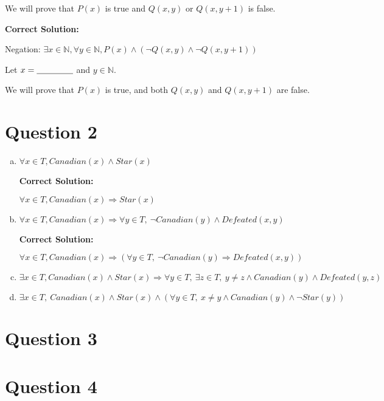 \documentclass[12pt]{article}
\begin{document}
\begin{enumerate}[a.]
    We will prove that $P(x)$ is true and $Q(x,y)$ or $Q(x, y+1)$ is false.

    \bigskip

    \textbf{Correct Solution:}

    Negation: $\exists x \in \mathbb{N}, \forall y \in \mathbb{N}, P(x) \land
    (\neg Q(x,y) \land \neg Q(x,y+1))$

    \bigskip

    Let $x = \underline{\hspace{1.5cm}}$ and $y \in \mathbb{N}$.

    We will prove that $P(x)$ is true, and both $Q(x,y)$ and $Q(x,y+1)$ are false.

\end{enumerate}

\section*{Question 2}
\begin{enumerate}[a.]
    \item

    $\forall x \in T, Canadian(x) \land Star(x)$

    \bigskip

    \textbf{Correct Solution:}

    $\forall x \in T, Canadian(x) \Rightarrow Star(x)$

    \item

    $\forall x \in T, Canadian(x) \Rightarrow \forall y \in T,\:\neg Canadian(y) \land Defeated(x,y)$

    \bigskip

    \textbf{Correct Solution:}

    $\forall x \in T, Canadian(x) \Rightarrow (\forall y \in T,\:\neg Canadian(y) \Rightarrow Defeated(x,y))$

    \item

    $\exists x \in T, Canadian(x) \land Star(x) \Rightarrow \forall y \in T,\:
    \exists z \in T,\: y \neq z \land Canadian(y) \land Defeated(y,z)$

    \item

    $\exists x \in T,\:Canadian(x) \land Star(x) \land (\forall y \in T,\: x \neq y
    \land Canadian(y) \land \neg Star(y))$

\end{enumerate}

\section*{Question 3}

\section*{Question 4}
\end{document}
